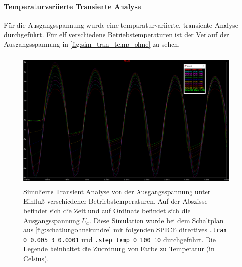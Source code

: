 \documentclass[12pt,english,ngerman]{scrartcl}
\begin{document}
\paragraph{Temperaturvariierte Transiente Analyse}
Für die Ausgangsspannung wurde eine temparaturvariierte, transiente Analyse durchgeführt. Für elf verschiedene Betriebstemperaturen ist der Verlauf der Ausgangsspannung in \autoref{fig:sim_tran_temp_ohne} zu sehen.
\begin{figure}[H]
  \centering
    \includegraphics[width=\linewidth, height=7cm]{./figures/ohnekondundre/temperaturausgang50mvr2auf10kohm.png }
    \caption[Simulierte Transient Analyse mit
    Überbrückungskondensator]{Simulierte Transient Analyse von der
      Ausgangsspannung unter Einfluß verschiedener Betriebstemperaturen. Auf
      der Abszisse befindet sich die Zeit und auf Ordinate befindet sich die
      Ausgangsspannung $U_a$. Diese Simulation wurde bei dem Schaltplan aus
    \autoref{fig:schatlungohnekundre} mit folgenden SPICE directives \texttt{.tran
      0 0.005 0 0.0001} und \texttt{.step temp 0 100 10} durchgeführt. Die Legende
    beinhaltet die Zuordnung von Farbe zu Temperatur (in Celsius).}
  \label{fig:sim_tran_temp_ohne_ohne_re}
\end{figure}

\end{document}
